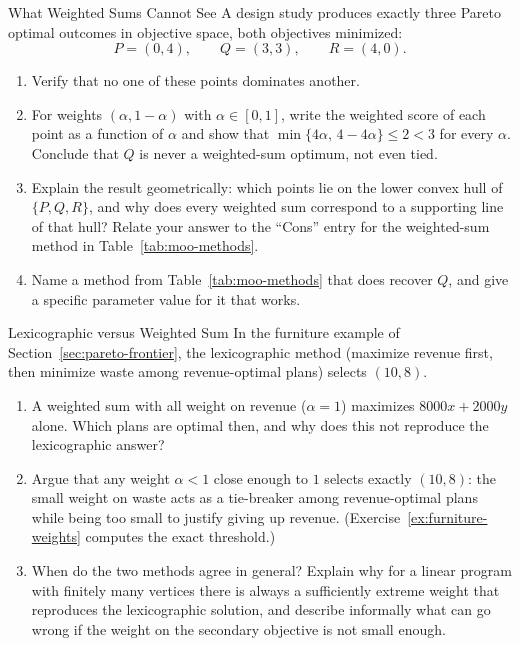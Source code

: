 
\begin{ex}{What Weighted Sums Cannot See}{}
\label{ex:nonconvex-weights}
A design study produces exactly three Pareto optimal outcomes in objective space, both objectives minimized:
\[
P = (0, 4), \qquad Q = (3, 3), \qquad R = (4, 0).
\]
\begin{enumerate}
\item Verify that no one of these points dominates another.
\item For weights $(\alpha, 1-\alpha)$ with $\alpha \in [0,1]$, write the weighted score of each point as a function of $\alpha$ and show that $\min\{4\alpha,\, 4 - 4\alpha\} \leq 2 < 3$ for every $\alpha$. Conclude that $Q$ is never a weighted-sum optimum, not even tied.
\item Explain the result geometrically: which points lie on the lower convex hull of $\{P, Q, R\}$, and why does every weighted sum correspond to a supporting line of that hull? Relate your answer to the ``Cons'' entry for the weighted-sum method in Table~\ref{tab:moo-methods}.
\item Name a method from Table~\ref{tab:moo-methods} that does recover $Q$, and give a specific parameter value for it that works.
\end{enumerate}
\end{ex}

\begin{ex}{Lexicographic versus Weighted Sum}{}
\label{ex:lex-vs-weighted}
In the furniture example of Section~\ref{sec:pareto-frontier}, the lexicographic method (maximize revenue first, then minimize waste among revenue-optimal plans) selects $(10, 8)$.
\begin{enumerate}
\item A weighted sum with all weight on revenue ($\alpha = 1$) maximizes $8000x + 2000y$ alone. Which plans are optimal then, and why does this not reproduce the lexicographic answer?
\item Argue that any weight $\alpha < 1$ close enough to $1$ selects exactly $(10, 8)$: the small weight on waste acts as a tie-breaker among revenue-optimal plans while being too small to justify giving up revenue. (Exercise~\ref{ex:furniture-weights} computes the exact threshold.)
\item When do the two methods agree in general? Explain why for a linear program with finitely many vertices there is always a sufficiently extreme weight that reproduces the lexicographic solution, and describe informally what can go wrong if the weight on the secondary objective is not small enough.
\end{enumerate}
\end{ex}

